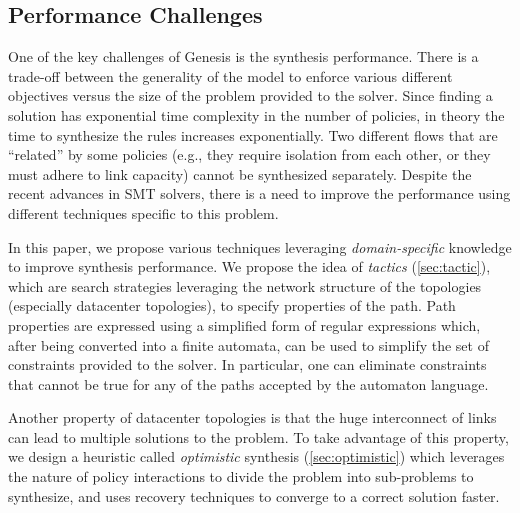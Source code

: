 \subsection{Performance Challenges} \label{sec:performance}

One of the key challenges of Genesis is the synthesis
performance. There is a trade-off between the generality of the model
to enforce various different objectives versus the size of the problem
provided to the solver.  Since finding a solution has exponential time
complexity in the number of policies, in theory the time to
synthesize the rules increases exponentially. Two different flows that
are ``related'' by some policies (e.g., they require isolation from
each other, or they must adhere to link capacity) cannot be
synthesized separately.  
Despite the recent advances in SMT solvers, there is a need to improve the performance
using different techniques specific to this problem.

In this paper, we propose various techniques leveraging
\emph{domain-specific} knowledge to improve synthesis performance. We
propose the idea of \emph{tactics} (\cref{sec:tactic}), which are
search strategies leveraging the network structure of the topologies
(especially datacenter topologies), to specify properties of the
path. 
Path properties are expressed using a simplified form of regular expressions which,
after being converted into a finite automata,
can be used
to simplify the set of constraints provided to the solver.
In particular, one can eliminate constraints that cannot be true for any of the paths
accepted by the automaton language. 

Another
property of datacenter topologies is that the huge interconnect of
links can lead to multiple solutions to the problem. 
To take advantage of this property, we design a
heuristic  called \emph{optimistic} synthesis
(\cref{sec:optimistic}) which leverages the nature of policy
interactions to divide the problem into sub-problems to synthesize,
and uses recovery techniques to converge to a correct solution faster.

